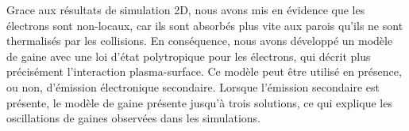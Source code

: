{Grace aux résultats de simulation 2D, nous avons mis en évidence que les électrons sont non-locaux, car ils sont absorbés plus vite aux parois qu'ils ne sont thermalisés par les collisions.
En conséquence, nous avons développé un modèle de gaine avec une loi d'état polytropique pour les électrons, qui décrit plus précisément l'interaction plasma-surface.
Ce modèle peut être utilisé en présence, ou non, d'émission électronique secondaire.
Lorsque l'émission secondaire est présente, le modèle de gaine présente jusqu'à trois solutions, ce qui explique les oscillations de gaines observées dans les simulations. 
% 
% 
% 
% 
% 

}															%

